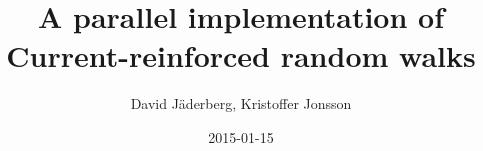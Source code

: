 \documentclass[a4paper,11pt]{article}
\date{2015-01-15}
\begin{document}
\title{A parallel implementation of Current-reinforced random walks}
\author{David J\"{a}derberg, Kristoffer Jonsson}
\maketitle


\pagebreak
\tableofcontents
\pagebreak




\clearpage


\clearpage



\clearpage

\end{document}
